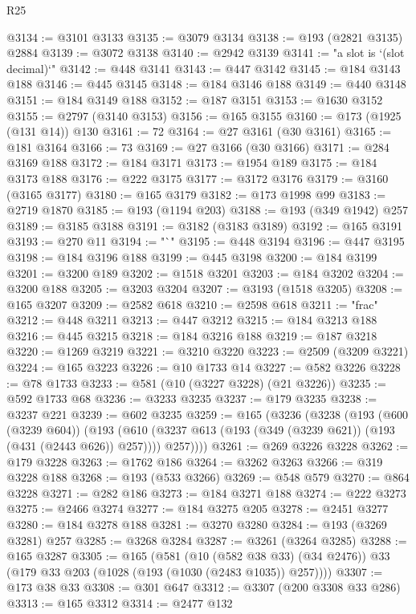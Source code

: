 \begin{lexlean}{R25}
\begin{coremodule}
@3134 := @3101 @3133
@3135 := @3079 @3134
@3138 := @193 (@2821 @3135) @2884
@3139 := @3072 @3138
@3140 := @2942 @3139
@3141 := "a slot is `(slot decimal)`"
@3142 := @448 @3141
@3143 := @447 @3142
@3145 := @184 @3143 @188
@3146 := @445 @3145
@3148 := @184 @3146 @188
@3149 := @440 @3148
@3151 := @184 @3149 @188
@3152 := @187 @3151
@3153 := @1630 @3152
@3155 := @2797 (@3140 @3153)
@3156 := @165 @3155
@3160 := @173 (@1925 (@131 @14)) @130
@3161 := 72
@3164 := @27 @3161 (@30 @3161)
@3165 := @181 @3164
@3166 := 73
@3169 := @27 @3166 (@30 @3166)
@3171 := @284 @3169 @188
@3172 := @184 @3171
@3173 := @1954 @189
@3175 := @184 @3173 @188
@3176 := @222 @3175
@3177 := @3172 @3176
@3179 := @3160 (@3165 @3177)
@3180 := @165 @3179
@3182 := @173 @1998 @99
@3183 := @2719 @1870
@3185 := @193 (@1194 @203)
@3188 := @193 (@349 @1942) @257
@3189 := @3185 @3188
@3191 := @3182 (@3183 @3189)
@3192 := @165 @3191
@3193 := @270 @11
@3194 := "`"
@3195 := @448 @3194
@3196 := @447 @3195
@3198 := @184 @3196 @188
@3199 := @445 @3198
@3200 := @184 @3199
@3201 := @3200 @189
@3202 := @1518 @3201
@3203 := @184 @3202
@3204 := @3200 @188
@3205 := @3203 @3204
@3207 := @3193 (@1518 @3205)
@3208 := @165 @3207
@3209 := @2582 @618
@3210 := @2598 @618
@3211 := "frac"
@3212 := @448 @3211
@3213 := @447 @3212
@3215 := @184 @3213 @188
@3216 := @445 @3215
@3218 := @184 @3216 @188
@3219 := @187 @3218
@3220 := @1269 @3219
@3221 := @3210 @3220
@3223 := @2509 (@3209 @3221)
@3224 := @165 @3223
@3226 := @10 @1733 @14
@3227 := @582 @3226
@3228 := @78 @1733
@3233 := @581 (@10 (@3227 @3228) (@21 @3226))
@3235 := @592 @1733 @68
@3236 := @3233 @3235
@3237 := @179 @3235
@3238 := @3237 @221
@3239 := @602 @3235
@3259 := @165
    (@3236
      (@3238
        (@193
          (@600 (@3239 @604))
          (@193
            (@610 (@3237 @613 (@193 (@349 (@3239 @621)) (@193 (@431 (@2443 @626)) @257))))
            @257))))
@3261 := @269 @3226 @3228
@3262 := @179 @3228
@3263 := @1762 @186
@3264 := @3262 @3263
@3266 := @319 @3228 @188
@3268 := @193 (@533 @3266)
@3269 := @548 @579
@3270 := @864 @3228
@3271 := @282 @186
@3273 := @184 @3271 @188
@3274 := @222 @3273
@3275 := @2466 @3274
@3277 := @184 @3275 @205
@3278 := @2451 @3277
@3280 := @184 @3278 @188
@3281 := @3270 @3280
@3284 := @193 (@3269 @3281) @257
@3285 := @3268 @3284
@3287 := @3261 (@3264 @3285)
@3288 := @165 @3287
@3305 := @165
    (@581
      (@10 (@582 @38 @33) (@34 @2476))
      @33
      (@179 @33 @203 (@1028 (@193 (@1030 (@2483 @1035)) @257))))
@3307 := @173 @38 @33
@3308 := @301 @647
@3312 := @3307 (@200 @3308 @33 @286)
@3313 := @165 @3312
@3314 := @2477 @132

\end{coremodule}
\end{lexlean}
